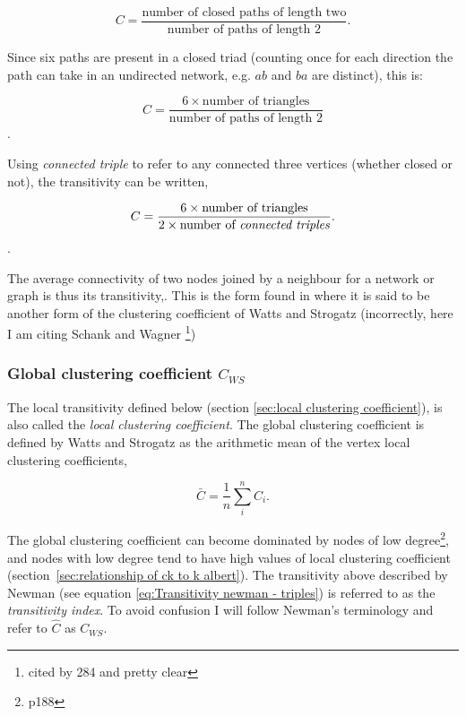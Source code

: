 \begin{equation}
    C = \frac{\textrm{number of closed paths of length two}}{\textrm{number of paths of length 2}}.
    \label{eq:Transitivity newman}
\end{equation}

Since six paths are present in a closed triad (counting once for each direction the path can take in an undirected network, e.g. $ab$ and $ba$ are distinct), this is:

\begin{equation}
    C = \frac{6 \times \textrm{number of triangles}}{\textrm{number of paths of length 2}}
\end{equation}.

Using \textit{connected triple} to refer to any connected three vertices (whether closed or not), the transitivity can be written,

\begin{equation}
    C = \frac{6 \times \textrm{number of triangles}}{2 \times \textrm{number of \textit{connected triples}}}.
      \label{eq:Transitivity newman - triples}
\end{equation}.

The average connectivity of two nodes joined by a neighbour for a network or graph is thus its transitivity\cite{newman2001structure},\cite{newman2018networks}. This is the form found in \cite{newman2002random} where it is said to be another form of the clustering coefficient of Watts and Strogatz (incorrectly, here I am citing  Schank and Wagner \cite{schank2005approximating}  \footnote{cited by 284 and pretty clear})



\subsubsection{Global clustering coefficient $C_{WS}$}
\label{sec:Global clustering coefficient}
The local transitivity defined below (section \ref{sec:local clustering coefficient}), is also called the \textit{local clustering coefficient}. The global clustering coefficient is defined by Watts and Strogatz\cite{watts1998collective} as the arithmetic mean of the vertex local clustering coefficients\cite{estrada2016local},


\begin{equation}
    \bar{C}=\frac{1}{n}\sum_i^n C_i.
\end{equation}


The global clustering coefficient can become dominated by nodes of low degree\cite{newman2018networks}\footnote{p188}, and nodes with low degree tend to have high values of local clustering coefficient (section~\ref{sec:relationship of ck to k albert}). The transitivity above described by Newman\cite{newman2002random} (see equation \ref{eq:Transitivity newman - triples}) is referred to as the \textit{transitivity index}\cite{estrada2016local}. To avoid confusion I will follow Newman's \cite{newman2018networks} terminology and refer to $\hat{C}$ as $C_{WS}$.

